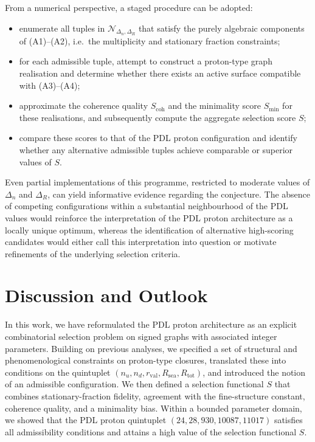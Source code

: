 \documentclass[11pt,a4paper]{article}
\theoremstyle{definition}
\begin{document}
From a numerical perspective, a staged procedure can be adopted:
\begin{itemize}
  \item enumerate all tuples in $\mathcal{N}_{\Delta_n,\Delta_R}$ that satisfy the purely algebraic components of (A1)–(A2), i.e.\ the multiplicity and stationary fraction constraints;
  \item for each admissible tuple, attempt to construct a proton-type graph realisation and determine whether there exists an active surface compatible with (A3)–(A4);\cite{Combinatorial_Proton_v2_2026,Effective_Fields_PDL_2026}
  \item approximate the coherence quality $S_{\mathrm{coh}}$ and the minimality score $S_{\mathrm{min}}$ for these realisations, and subsequently compute the aggregate selection score $S$;
  \item compare these scores to that of the PDL proton configuration and identify whether any alternative admissible tuples achieve comparable or superior values of $S$.
\end{itemize}

Even partial implementations of this programme, restricted to moderate values of $\Delta_n$ and $\Delta_R$, can yield informative evidence regarding the conjecture.\cite{Combinatorial_Proton_v2_2026} The absence of competing configurations within a substantial neighbourhood of the PDL values would reinforce the interpretation of the PDL proton architecture as a locally unique optimum, whereas the identification of alternative high-scoring candidates would either call this interpretation into question or motivate refinements of the underlying selection criteria.

\section{Discussion and Outlook}
\label{sec:discussion}

In this work, we have reformulated the PDL proton architecture as an explicit combinatorial selection problem on signed graphs with associated integer parameters. Building on previous analyses, we specified a set of structural and phenomenological constraints on proton-type closures, translated these into conditions on the quintuplet $(n_u,n_d,r_{\mathrm{val}},R_{\mathrm{sea}},R_{\mathrm{tot}})$, and introduced the notion of an admissible configuration.\cite{Combinatorial_Proton_v2_2026,PDL_Global_Mapping_2026} We then defined a selection functional $S$ that combines stationary-fraction fidelity, agreement with the fine-structure constant, coherence quality, and a minimality bias. Within a bounded parameter domain, we showed that the PDL proton quintuplet $(24,28,930,10087,11017)$ satisfies all admissibility conditions and attains a high value of the selection functional $S$.\cite{Combinatorial_Proton_v2_2026,Alpha_PDL_v2_2026}
\end{document}
